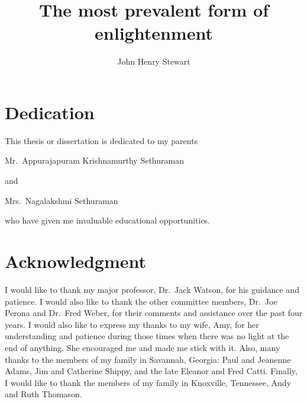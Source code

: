\documentclass{uoflthesis} %
\title{The most prevalent form of enlightenment}
\author{John Henry Stewart}
\begin{document}
\frontmatter

\maketitle

\copyrightpage


\section*{Dedication}
\begin{center}
This thesis or dissertation is dedicated to my parents

Mr.~Appurajapuram Krishnamurthy Sethuraman

and

Mrs.~Nagalakshmi Sethuraman

who have given me invaluable educational opportunities.
\end{center}

\section*{Acknowledgment}

I would like to thank my major professor, Dr.~Jack Watson, for his guidance and
patience. I would also like to thank the other committee members, Dr.~Joe Perona and
Dr.~Fred Weber, for their comments and assistance over the past four years. I would also
like to express my thanks to my wife, Amy, for her understanding and patience during
those times when there was no light at the end of anything. She encouraged me and made
me stick with it. Also, many thanks to the members of my family in Savannah, Georgia:
Paul and Jeanenne Adams, Jim and Catherine Shippy, and the late Eleanor and Fred Catti.
Finally, I would like to thank the members of my family in Knoxville, Tennessee, Andy
and Ruth Thomason.

\begin{abstract}
\lipsum
\end{abstract}
\end{document}
